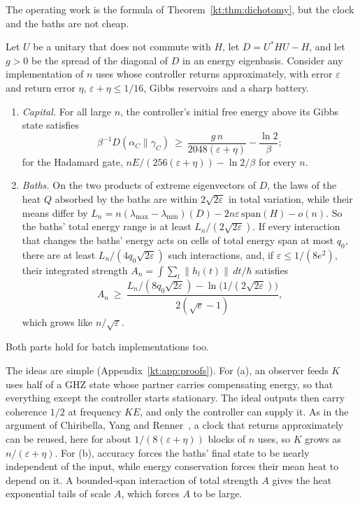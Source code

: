 The operating work is the formula of Theorem~\ref{kt:thm:dichotomy}, but the clock and the baths are not cheap.

\begin{proposition}\label{kt:prop:clockcost}
Let $U$ be a unitary that does not commute with $H$, let $D=U^*HU-H$, and let $g>0$ be the spread of the diagonal of $D$ in an energy eigenbasis. Consider any implementation of $n$ uses whose controller returns approximately, with error $\varepsilon$ and return error $\eta$, $\varepsilon+\eta\le1/16$, Gibbs reservoirs and a sharp battery.
\begin{enumerate}[label=(\alph*)]
\item \emph{Capital.} For all large $n$, the controller's initial free energy above its Gibbs state satisfies
\[
\beta^{-1}D(\alpha_C\|\gamma_C)\ \ge\ \frac{g\,n}{2048(\varepsilon+\eta)}-\frac{\ln2}\beta;
\]
for the Hadamard gate, $nE/(256(\varepsilon+\eta))-\ln2/\beta$ for every $n$.
\item \emph{Baths.} On the two products of extreme eigenvectors of $D$, the laws of the heat $Q$ absorbed by the baths are within $2\sqrt{2\varepsilon}$ in total variation, while their means differ by $L_n=n(\lambda_{\max}-\lambda_{\min})(D)-2n\varepsilon\,\mathrm{span}(H)-o(n)$. So the baths' total energy range is at least $L_n/(2\sqrt{2\varepsilon})$. If every interaction that changes the baths' energy acts on cells of total energy span at most $q_0$, there are at least $L_n/(4q_0\sqrt{2\varepsilon})$ such interactions, and, if $\varepsilon\le1/(8e^2)$, their integrated strength $A_n=\int\sum_l\|h_l(t)\|\,dt/\hbar$ satisfies
\[
A_n\ \ge\ \frac{L_n/(8q_0\sqrt{2\varepsilon})-\ln\bigl(1/(2\sqrt{2\varepsilon})\bigr)}{2(\sqrt e-1)},
\]
which grows like $n/\sqrt\varepsilon$.
\end{enumerate}
Both parts hold for batch implementations too.
\end{proposition}

The ideas are simple (Appendix~\ref{kt:app:proofs}). For (a), an observer feeds $K$ uses half of a GHZ state whose partner carries compensating energy, so that everything except the controller starts stationary. The ideal outputs then carry coherence $1/2$ at frequency $KE$, and only the controller can supply it. As in the argument of Chiribella, Yang and Renner~\cite{ChiribellaYangRenner21}, a clock that returns approximately can be reused, here for about $1/(8(\varepsilon+\eta))$ blocks of $n$ uses, so $K$ grows as $n/(\varepsilon+\eta)$. For (b), accuracy forces the baths' final state to be nearly independent of the input, while energy conservation forces their mean heat to depend on it. A bounded-span interaction of total strength $A$ gives the heat exponential tails of scale $A$, which forces $A$ to be large.

